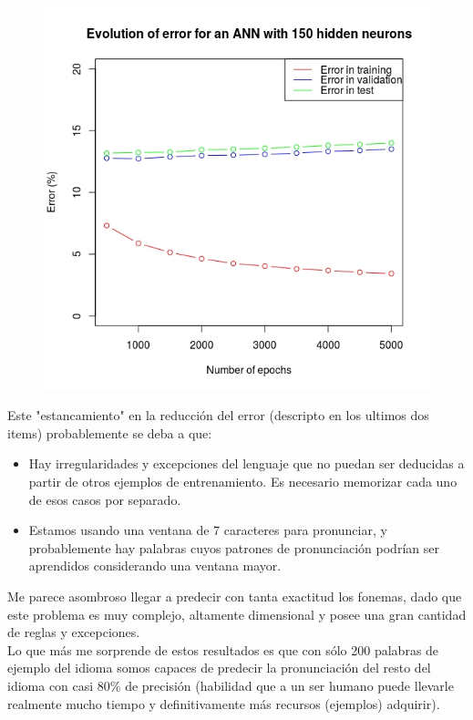 \documentclass[paper=a4, fontsize=11pt]{scrartcl} %
\numberwithin{equation}{section} %
\numberwithin{figure}{section} %
\numberwithin{table}{section} %
\begin{document}
\begin{figure}[h!]
\centering
\includegraphics[width=112mm]{imgs/annresults2.jpg}
\end{figure}

Este "estancamiento" en la reducción del error (descripto en los ultimos dos items) probablemente se deba a que:

\begin{itemize}
\item Hay irregularidades y excepciones del lenguaje que no puedan ser deducidas a partir de otros ejemplos de entrenamiento. Es necesario memorizar cada uno de esos casos por separado.
\item Estamos usando una ventana de 7 caracteres para pronunciar, y probablemente hay palabras cuyos patrones de pronunciación podrían ser aprendidos considerando una ventana mayor.
\end{itemize}


Me parece asombroso llegar a predecir con tanta exactitud los fonemas, dado que este problema es muy complejo, altamente dimensional y posee una gran cantidad de reglas y excepciones. \\

Lo que más me sorprende de estos resultados es que con sólo 200 palabras de ejemplo del idioma somos capaces de predecir la pronunciación del resto del idioma con casi 80\% de precisión (habilidad que a un ser humano puede llevarle realmente mucho tiempo y definitivamente más recursos (ejemplos) adquirir). \\
\end{document}
